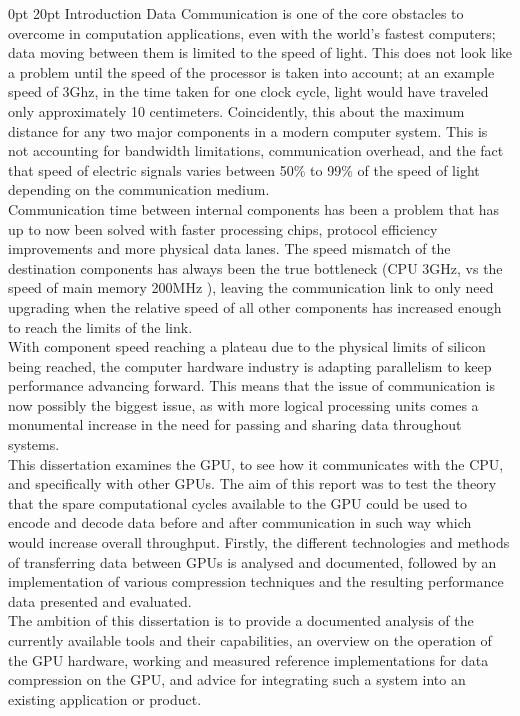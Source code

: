 \documentclass[12pt,a4paper]{article}
\makeatletter
\renewcommand\section{\@startsection {section}{1}{0mm} %
                               {0pt} %
                               {20pt} %
                               {\fontsize{14pt}{1em}\bfseries\newpage}}
\makeatother
\begin{document}
\section{Introduction}
Data Communication is one of the core obstacles to overcome in computation applications, even with the world's fastest computers; data moving between them is limited to the speed of light. This does not look like a problem until the speed of the processor is taken into account; at an example speed of 3Ghz, in the time taken for one clock cycle, light would have traveled only approximately 10 centimeters. Coincidently, this about the maximum distance for any two major components in a modern computer system. This is not accounting for bandwidth limitations, communication overhead, and the fact that speed of electric signals varies between 50\% to 99\% of the speed of light depending on the communication medium.
\\
Communication time between internal components has been a problem that has up to now been solved with faster processing chips, protocol efficiency improvements and more physical data lanes. The speed mismatch of the destination components has always been the true bottleneck (CPU 3GHz, vs the speed of main memory 200MHz ), leaving the communication link to only need upgrading when the relative speed of all other components has increased enough to reach the limits of the link.
\\
With component speed reaching a plateau due to the physical limits of silicon being reached, the computer hardware industry is adapting parallelism to keep performance advancing forward. This means that the issue of communication is now possibly the biggest issue, as with more logical processing units comes a monumental increase in the need for passing and sharing data throughout systems.
\\
This dissertation examines the GPU, to see how it communicates with the CPU, and specifically with other GPUs. The aim of this report was to test the theory that the spare computational cycles available to the GPU could be used to encode and decode data before and after communication in such way which would increase overall throughput. Firstly, the different technologies and methods of transferring data between GPUs is analysed and documented, followed by an implementation of various compression techniques and the resulting performance data presented and evaluated.
\\
The ambition of this dissertation is to provide a documented analysis of the currently available tools and their capabilities, an overview on the operation of the GPU hardware, working and measured reference implementations for data compression on the GPU, and advice for integrating such a system into an existing application or product.
\end{document}
